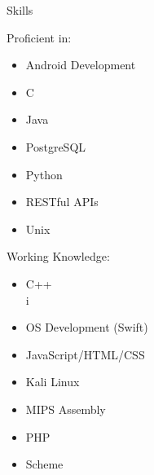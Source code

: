 \documentclass{res}
\begin{document}
\begin{resume}
{\huge Skills}\\[2mm]
\begin{minipage}{0.45\textwidth}
	{\Large Proficient in:}\\
		\begin{itemize}[noitemsep,nolistsep]
			\vspace{-3mm}
			\item Android Development\\
			\vspace{-3mm}
			\item C\\
			\vspace{-3mm}
			\item Java\\
			\vspace{-3mm}
			\item PostgreSQL\\
			\vspace{-3mm}
			\item Python\\
			\vspace{-3mm}
			\item RESTful APIs\\
			\vspace{-3mm}
			\item Unix\\
		\end{itemize}
\end{minipage}
\begin{minipage}{0.45\textwidth}
	{\Large Working Knowledge:}\\
		\begin{itemize}[noitemsep,nolistsep]
			\vspace{-3mm}
			\item C++\\
			\vspace{-3mm}
			i\item OS Development (Swift)\\
			\vspace{-3mm}
			\item JavaScript/HTML/CSS\\
			\vspace{-3mm}
			\item Kali Linux\\
			\vspace{-3mm}
			\item MIPS Assembly\\
			\vspace{-3mm}
			\item PHP\\
			\vspace{-3mm}
			\item Scheme\\
		\end{itemize}
\end{minipage}


\end{resume}
\end{document}
